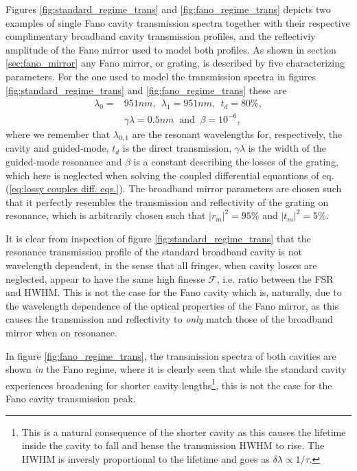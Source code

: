 Figures \ref{fig:standard_regime_trans} and \ref{fig:fano_regime_trans} depicts two examples of single Fano cavity transmission spectra together with their respective complimentary broadband cavity transmission profiles, and the reflectiviy amplitude of the Fano mirror used to model both profiles. As shown in section \ref{sec:fano_mirror} any Fano mirror, or grating, is described by five characterizing parameters. For the one used to model the transmission spectra in figures \ref{fig:standard_regime_trans} and \ref{fig:fano_regime_trans}  these are 
\begin{equation}
    \begin{split}
    \lambda_0 = &951 nm,\:\: \lambda_1 = 951 nm,\:\: t_d = 80\%,\\ &\gamma \lambda = 0.5 nm\: \text{ and }\: \beta = 10^{-6},
    \end{split}
\end{equation}
where we remember that $\lambda_{0,1}$ are the resonant wavelengths for, respectively, the cavity and guided-mode, $t_d$ is the direct transmission, $\gamma \lambda$ is the width of the guided-mode resonance and $\beta$ is a constant describing the losses of the grating, which here is neglected when solving the coupled differential equantions of eq. (\ref{eq:lossy couples diff. eqs.}). The broadband mirror parameters are chosen such that it perfectly resembles the transmission and reflectivity of the grating on resonance, which is arbitrarily chosen such that $|r_{m}|^2=95\%$ and $|t_{m}|^2 = 5\%$.

It is clear from inspection of figure \ref{fig:standard_regime_trans} that the resonance transmission profile of the standard broadband cavity is not wavelength dependent, in the sense that all fringes, when cavity losses are neglected, appear to have the same high finesse $\mathcal{F}$, i.e. ratio between the FSR and HWHM. This is not the case for the Fano cavity which is, naturally, due to the wavelength dependence of the optical properties of the Fano mirror, as this causes the transmission and reflectivity to \emph{only} match those of the broadband mirror when on resonance. 

In figure \ref{fig:fano_regime_trans}, the transmission spectra of both cavities are shown \emph{in} the Fano regime, where it is clearly seen that while the standard cavity experiences broadening for shorter cavity lengths\footnote{This is a natural consequence of the shorter cavity as this causes the lifetime inside the cavity to fall and hense the transmission HWHM to rise. The HWHM is inversly proportional to the lifetime and goes as $\delta \lambda \propto 1/\tau$.}, this is not the case for the Fano cavity transmission peak.

